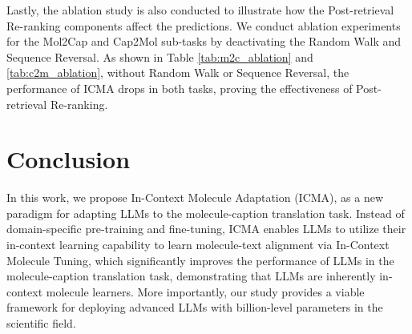 \begin{table}[htbp]
    \centering
    \vskip -0.1in
    \caption{Ablating components of Post-retrieval Re-ranking for Cap2Mol task (\textbf{Best}, \underline{Second Best}). The backbone is ICMA(Galactica-125M)$_{2,1024}$.}
    \label{tab:c2m_ablation}
    \vskip -0.1in
\end{table}
Lastly, the ablation study is also conducted to illustrate how the Post-retrieval Re-ranking components affect the predictions. 
We conduct ablation experiments for the Mol2Cap and Cap2Mol sub-tasks by deactivating the Random Walk and Sequence Reversal.
As shown in Table \ref{tab:m2c_ablation} and \ref{tab:c2m_ablation}, without Random Walk or Sequence Reversal, the performance of ICMA drops in both tasks, proving the effectiveness of Post-retrieval Re-ranking.

\section{Conclusion}
\label{sec:conclusion}
In this work, we propose In-Context Molecule Adaptation (ICMA), as a new paradigm for adapting LLMs to the molecule-caption translation task. 
Instead of domain-specific pre-training and fine-tuning, ICMA enables LLMs to utilize their in-context learning capability to learn molecule-text alignment via In-Context Molecule Tuning, which significantly improves the performance of LLMs in the molecule-caption translation task, demonstrating that LLMs are inherently in-context molecule learners.
More importantly, our study provides a viable framework for deploying advanced LLMs with billion-level parameters in the scientific field.

